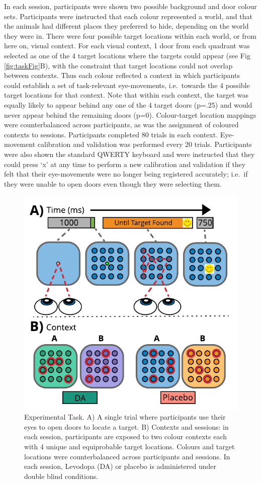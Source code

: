 \documentclass{article}
\begin{document}
In each session, participants were shown two possible background and
door colour sets. Participants were instructed that each colour
represented a world, and that the animals had different places they
preferred to hide, depending on the world they were in. There were four
possible target locations within each world, or from here on, visual
context. For each visual context, 1 door from each quadrant was selected
as one of the 4 target locations where the targets could appear (see Fig
\ref{fig:taskFig}B), with the constraint that target locations could not
overlap between contexts. Thus each colour reflected a context in which
participants could establish a set of task-relevant eye-movements,
i.e.~towards the 4 possible target locations for that context. Note that
within each context, the target was equally likely to appear behind any
one of the 4 target doors (p=.25) and would never appear behind the
remaining doors (p=0). Colour-target location mappings were
counterbalanced across participants, as was the assignment of coloured
contexts to sessions. Participants completed 80 trials in each context.
Eye-movement calibration and validation was performed every 20 trials.
Participants were also shown the standard QWERTY keyboard and were
instructed that they could press `x' at any time to perform a new
calibration and validation if they felt that their eye-movements were no
longer being registered accurately; i.e.~if they were unable to open
doors even though they were selecting them.

\begin{figure}

{\centering \includegraphics[width=0.7\linewidth]{../../images/DA_ExpTask} 

}

\caption{Experimental Task. A) A single trial where participants use their eyes to open doors to locate a target. B) Contexts and sessions: in each session, participants are exposed to two colour contexts each with 4 unique and equiprobable target locations. Colours and target locations were counterbalanced across participants and sessions. In each session, Levodopa (DA) or placebo is administered under double blind conditions.}\label{fig:taskfig}
\end{figure}
\end{document}
